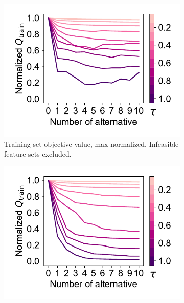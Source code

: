 \documentclass{article}
\theoremstyle{definition}
\begin{document}
\begin{figure}[p]
	\centering
	\begin{subfigure}[t]{0.48\textwidth}
		\centering
		\includegraphics[width=\textwidth, trim=15 17 10 15, clip]{plots/afs-impact-num-alternatives-tau-train-objective-max.pdf}
		\caption{
			Training-set objective value, max-normalized.
			Infeasible feature sets excluded.
		}
		\label{fig:afs:impact-num-alternatives-tau-train-objective-max}
	\end{subfigure}
	\hfill
	\begin{subfigure}[t]{0.48\textwidth}
		\centering
		\includegraphics[width=\textwidth, trim=15 17 10 15, clip]{plots/afs-impact-num-alternatives-tau-train-objective-max-fillna.pdf}

\end{subfigure}
\end{figure}
\end{document}
